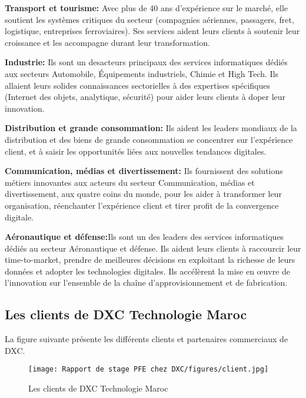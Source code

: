 \begin{description}
  \item \textbf{Transport et tourisme:} Avec plus de 40 ans d’expérience sur le marché, elle soutient les systèmes critiques du secteur (compagnies aériennes, passagers, fret, logistique, entreprises ferroviaires). Ses services aident leurs clients à soutenir leur croissance et les accompagne durant leur transformation.
  \item \textbf{Industrie:} Ils sont un desacteurs principaux des services informatiques dédiés aux secteurs Automobile, Équipements industriels, Chimie et High Tech. Ils allaient leurs solides connaissances sectorielles à des expertises spécifiques (Internet des objets, analytique, sécurité) pour aider leurs clients à doper leur innovation.
  \item \textbf{Distribution et grande consommation:} Ils aident les leaders mondiaux de la distribution et des biens de grande consommation se concentrer sur l’expérience client, et à saisir les opportunités liées aux nouvelles tendances digitales.
  \item \textbf{Communication, médias et divertissement:} Ils fournissent des solutions métiers innovantes aux acteurs du secteur Communication, médias et divertissement, aux quatre coins du monde, pour les aider à transformer leur organisation, réenchanter l’expérience client et tirer profit de la convergence digitale.
  \item \textbf{Aéronautique et défense:}Ils sont un des leaders des services informatiques dédiés au secteur Aéronautique et défense. Ils aident leurs clients à raccourcir leur time-to-market, prendre de meilleures décisions en exploitant la richesse de leurs données et adopter les technologies digitales. Ils accélèrent la mise en œuvre de l’innovation sur l’ensemble de la chaîne d’approvisionnement et de fabrication.
  
\end{description}

\subsection{Les clients de DXC Technologie Maroc }

La figure suivante présente les différents clients et partenaires commerciaux de DXC.

\begin{figure}[!h]
    \centering
    \texttt{[image: Rapport de stage PFE chez DXC/figures/client.jpg]}
    \caption{Les clients de DXC Technologie Maroc}
\end{figure}

